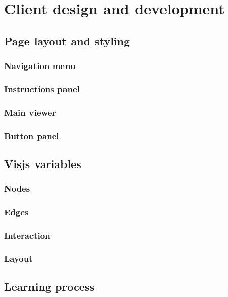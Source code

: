 \chapter{Client design and development}
\label{ch:client}

\section{Page layout and styling}

\subsection{Navigation menu}

\subsection{Instructions panel}

\subsection{Main viewer}

\subsection{Button panel}

\section{Visjs variables}

\subsection{Nodes}

\subsection{Edges}

\subsection{Interaction}

\subsection{Layout}

\section{Learning process}

